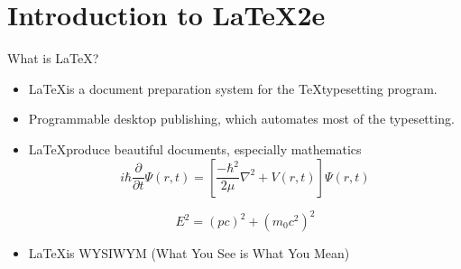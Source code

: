 \documentclass[10pt,times]{beamer}
\subtitle{Part I: Introduction to \LaTeX}
\begin{document}
\begin{frame}
  \titlepage
\end{frame}
\section{Introduction to \LaTeX2e}

\begin{frame}{What is \LaTeX?}
\begin{itemize}
\item \LaTeX is a document preparation system for the \TeX typesetting 
program. 

\item Programmable desktop publishing, which automates most of the typesetting.

\item \LaTeX produce beautiful documents, especially mathematics
\begin{equation*}
i \hbar \frac{\partial}{\partial t} \Psi(r,t) = 
\left[\frac{-\hbar^2}{2\mu}\nabla^2+V(r,t)\right]\Psi(r,t)
\end{equation*}

\begin{equation*}
E^2 = (pc)^2 + (m_0 c^2)^2
\end{equation*}

\item \LaTeX is WYSIWYM (What You See is What You Mean)

\end{itemize}
\end{frame}
\end{document}
